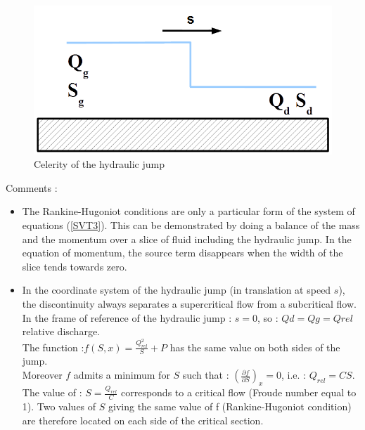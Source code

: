 \begin{figure}[H]
 \begin{center}
  \includegraphics[width=\textwidth]{Figures/vitesse.png}
  \caption{Celerity of the hydraulic jump}
 \end{center}
\end{figure}

\begin{CommentBlock}{Comments :}
\begin{itemize}
 \item The Rankine-Hugoniot conditions are only a particular form of the system of equations (\ref{SVT3}). This can be demonstrated by doing a balance of the mass and the momentum over a slice of fluid including the hydraulic jump. In the equation of momentum, the source term disappears when the width of the slice tends towards zero.
 \item In the coordinate system of the hydraulic jump (in translation at speed $s$), the discontinuity always separates a supercritical flow from a subcritical flow. \\ In the frame of reference of the hydraulic jump : $s = 0$, so : $Qd = Qg = Qrel$ relative discharge.\\
The function :$f(S,x) = \frac{Q_{rel}^2}{S} + P$ has the same value on both sides of the jump.\\
Moreover $f$ admits a minimum for $S$ such that : $\left ( \frac{\partial f}{\partial S}\right )_x = 0$, i.e. : $Q_{rel} = C S$. The value of : $S = \frac{Q_{rel}}{C}$ corresponds to a critical flow (Froude number equal to 1). Two values of $S$ giving the same value of f (Rankine-Hugoniot condition) are therefore located on each side of the critical section.
\end{itemize}
\end{CommentBlock}

